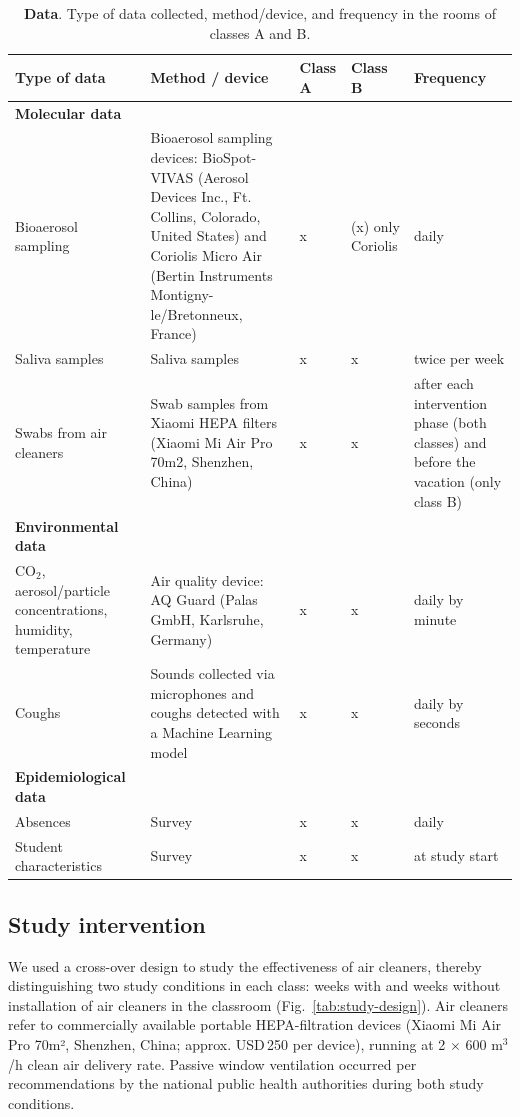 \documentclass[fleqn,11pt]{wlscirep}
\begin{document}
\begin{table}[!htpb]
    \footnotesize
    \centering
    \caption{\textbf{Data}. Type of data collected, method/device, and frequency in the rooms of classes A and B.}
    \begin{tabular}{p{3.5cm}p{6cm} p{1cm} p{1cm} p{3cm}}
    \midrule
    Type of data & Method / device & Class A & Class B & Frequency \\
    \midrule
    \textbf{Molecular data} \\
    \midrule
    Bioaerosol sampling & Bioaerosol sampling devices: BioSpot-VIVAS (Aerosol Devices Inc., Ft. Collins, Colorado, United States) and Coriolis Micro Air (Bertin Instruments Montigny-le/Bretonneux, France) & x & (x) \newline only Coriolis & daily \\
    Saliva samples & Saliva samples & x & x & twice per week \\
    Swabs from air cleaners & Swab samples from Xiaomi HEPA filters (Xiaomi Mi Air Pro 70m2, Shenzhen, China) & x & x & after each intervention phase (both classes) and before the vacation (only class B) \\ 
    \midrule
    \textbf{Environmental data} \\
    \midrule
    CO$_2$, aerosol/particle concentrations, humidity, temperature & Air quality device: AQ Guard (Palas GmbH, Karlsruhe, Germany) & x & x & daily by minute \\
    Coughs & Sounds collected via microphones and coughs detected with a Machine Learning model \cite{Bertschinger2023CBMS} & x & x & daily by seconds \\
    \midrule
    \textbf{Epidemiological data} \\
    \midrule
    Absences & Survey & x & x & daily \\
    Student characteristics & Survey & x & x & at study start \\
    \bottomrule
    \end{tabular}
    \label{tab:data}
\end{table}

\subsection{Study intervention} 

\noindent We used a cross-over design to study the effectiveness of air cleaners, thereby distinguishing two study conditions in each class: weeks with and weeks without installation of air cleaners in the classroom (Fig.~\ref{tab:study-design}). Air cleaners refer to commercially available portable HEPA-filtration devices (Xiaomi Mi Air Pro 70m², Shenzhen, China; approx. USD\,250 per device), running at 2$\,\times\,$600 m$^{3}$/h clean air delivery rate. Passive window ventilation occurred per recommendations by the national public health authorities during both study conditions.
\end{document}
